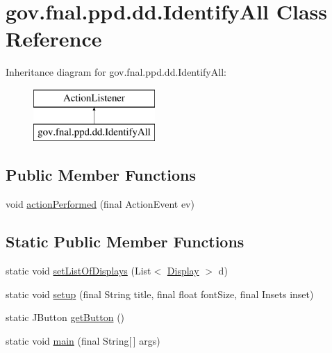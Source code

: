\hypertarget{classgov_1_1fnal_1_1ppd_1_1dd_1_1IdentifyAll}{\section{gov.\-fnal.\-ppd.\-dd.\-Identify\-All Class Reference}
\label{classgov_1_1fnal_1_1ppd_1_1dd_1_1IdentifyAll}
}
Inheritance diagram for gov.\-fnal.\-ppd.\-dd.\-Identify\-All\-:\begin{figure}[H]
\begin{center}
\leavevmode
\includegraphics[height=2.000000cm]{classgov_1_1fnal_1_1ppd_1_1dd_1_1IdentifyAll}
\end{center}
\end{figure}
\subsection*{Public Member Functions}
\begin{DoxyCompactItemize}
\item 
void \hyperlink{classgov_1_1fnal_1_1ppd_1_1dd_1_1IdentifyAll_aaa98b5c9c84be6044758b7646b45c544}{action\-Performed} (final Action\-Event ev)
\end{DoxyCompactItemize}
\subsection*{Static Public Member Functions}
\begin{DoxyCompactItemize}
\item 
static void \hyperlink{classgov_1_1fnal_1_1ppd_1_1dd_1_1IdentifyAll_a481aeb17dac457f3707e55e440c7acd7}{set\-List\-Of\-Displays} (List$<$ \hyperlink{interfacegov_1_1fnal_1_1ppd_1_1dd_1_1signage_1_1Display}{Display} $>$ d)
\item 
static void \hyperlink{classgov_1_1fnal_1_1ppd_1_1dd_1_1IdentifyAll_a16820458eeb294d8ad601a7ae37bb43f}{setup} (final String title, final float font\-Size, final Insets inset)
\item 
static J\-Button \hyperlink{classgov_1_1fnal_1_1ppd_1_1dd_1_1IdentifyAll_a688124fec7e6167e589c184e045b83ac}{get\-Button} ()
\item 
static void \hyperlink{classgov_1_1fnal_1_1ppd_1_1dd_1_1IdentifyAll_ac4a1086e71fcfe522dc76b8788223d45}{main} (final String\mbox{[}$\,$\mbox{]} args)
\end{DoxyCompactItemize}



